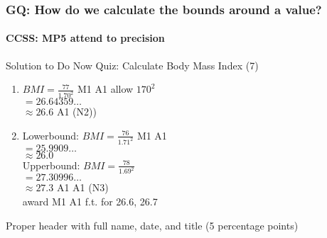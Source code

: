 \documentclass{beamer}
\begin{document}
  \frame
  {
    \frametitle{GQ: How do we calculate the bounds around a value?}
    \framesubtitle{CCSS: MP5 attend to precision}

    \begin{block}{Solution to Do Now Quiz: Calculate Body Mass Index 
      \alert{(7)}}
      \begin{enumerate} 
          \item $\displaystyle BMI = \frac{77}{1.70^2}$ 
          \hspace{3cm} \alert{M1 A1 allow $170^2$}\\ \smallskip
            \hspace{0.8cm} $=26.64359 \dots$ \\
          \hspace{0.8cm} $\approx 26.6$ 
            \hspace{3.2cm} \alert{A1 (N2))}
          \item Lowerbound: $\displaystyle BMI = \frac{76}{1.71^2}$ 
          \hspace{0.8cm} \alert{M1 A1} \\ \smallskip
          \hspace{0.8cm} $=25.9909 \dots$ \\
          \hspace{0.8cm} $\approx 26.0$  \\ \smallskip
          Upperbound: $\displaystyle BMI = \frac{78}{1.69^2}$ \\ \smallskip
          \hspace{0.8cm} $=27.30996 \dots$ \\
          \hspace{0.8cm} $\approx 27.3$  \hspace{3cm} \alert{A1 A1 (N3)} \\
          \hspace{4cm} \alert{award M1 A1 f.t. for 26.6, 26.7}
       \end{enumerate}
      \end{block}
    Proper header with full name, date, and title (5 percentage points)
    
  }
\end{document}
